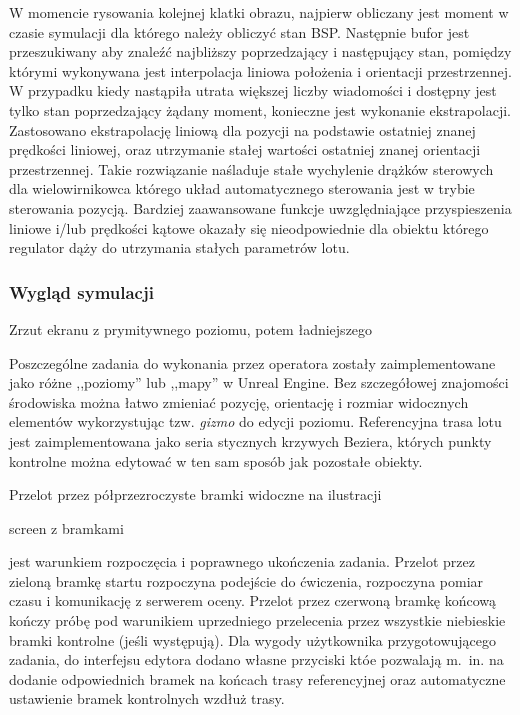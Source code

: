 W momencie rysowania kolejnej klatki obrazu, najpierw obliczany jest moment w czasie symulacji dla którego należy obliczyć stan BSP. Następnie bufor jest przeszukiwany aby znaleźć najbliższy poprzedzający i następujący stan, pomiędzy którymi wykonywana jest interpolacja liniowa położenia i orientacji przestrzennej. W przypadku kiedy nastąpiła utrata większej liczby wiadomości i dostępny jest tylko stan poprzedzający żądany moment, konieczne jest wykonanie ekstrapolacji. Zastosowano ekstrapolację liniową dla pozycji na podstawie ostatniej znanej prędkości liniowej, oraz utrzymanie stałej wartości ostatniej znanej orientacji przestrzennej. Takie rozwiązanie naśladuje stałe wychylenie drążków sterowych dla wielowirnikowca którego układ automatycznego sterowania jest w trybie sterowania pozycją. Bardziej zaawansowane funkcje uwzględniające przyspieszenia liniowe i/lub prędkości kątowe okazały się nieodpowiednie dla obiektu którego regulator dąży do utrzymania stałych parametrów lotu.

\subsubsection{Wygląd symulacji}
\begin{todo}
    Zrzut ekranu z prymitywnego poziomu, potem ładniejszego
\end{todo}
Poszczególne zadania do wykonania przez operatora zostały zaimplementowane jako różne ,,poziomy'' lub ,,mapy'' w Unreal Engine. Bez szczegółowej znajomości środowiska można łatwo zmieniać pozycję, orientację i rozmiar widocznych elementów wykorzystując tzw. \emph{gizmo} do edycji poziomu. Referencyjna trasa lotu jest zaimplementowana jako seria stycznych krzywych Beziera, których punkty kontrolne można edytować w ten sam sposób jak pozostałe obiekty.

Przelot przez półprzezroczyste bramki widoczne na ilustracji \begin{todo}screen z bramkami\end{todo} jest warunkiem rozpoczęcia i poprawnego ukończenia zadania. Przelot przez zieloną bramkę startu rozpoczyna podejście do ćwiczenia, rozpoczyna pomiar czasu i komunikację z serwerem oceny. Przelot przez czerwoną bramkę końcową kończy próbę pod warunikiem uprzedniego przelecenia przez wszystkie niebieskie bramki kontrolne (jeśli występują). Dla wygody użytkownika przygotowującego zadania, do interfejsu edytora dodano własne przyciski któe pozwalają m.~in. na dodanie odpowiednich bramek na końcach trasy referencyjnej oraz automatyczne ustawienie bramek kontrolnych wzdłuż trasy.

